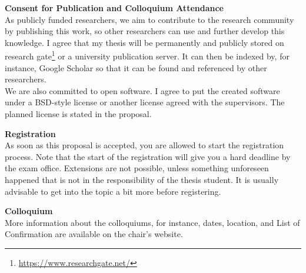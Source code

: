 \documentclass[a4paper]{article}
\begin{document}











\def\bibpreamble{Reference all sources that are cited in your proposal using, e.g., the APA, Harvard, or IEEE style.}
\nocite{*}

\newpage
\begin{flushleft}
    {\Large{\textbf{Consent for Publication and Colloquium Attendance}}}\\
    \bigskip 
    As publicly funded researchers, we aim to contribute to the research community by publishing this work, so other researchers can use and further develop this knowledge. I agree that my thesis will be permanently and publicly stored on research gate\footnote{\url{https://www.researchgate.net/}} or a university publication server. It can then be indexed by, for instance, Google Scholar so that it can be found and referenced by other researchers.\\
    
    We are also committed to open software. I agree to put the created software under a BSD-style license or another license agreed with the supervisors. The planned license is stated in the proposal.\\

         
\end{flushleft}
\vspace{0.4cm}
\noindent{}
\bigskip
\begin{flushleft}
	{\Large{\textbf{Registration}}}\\
	\bigskip 
	As soon as this proposal is accepted, you are allowed to start the registration process. Note that the start of the registration will give you a hard deadline by the exam office. Extensions are not possible, unless something unforeseen happened that is not in the responsibility of the thesis student. It is usually advisable to get into the topic a bit more before registering.
\end{flushleft}
\bigskip
\begin{flushleft}
	{\Large{\textbf{Colloquium}}}\\
	\bigskip 
	More information about the colloquiums, for instance, dates, location, and List of Confirmation are available on the chair's website.
\end{flushleft}
\end{document}
